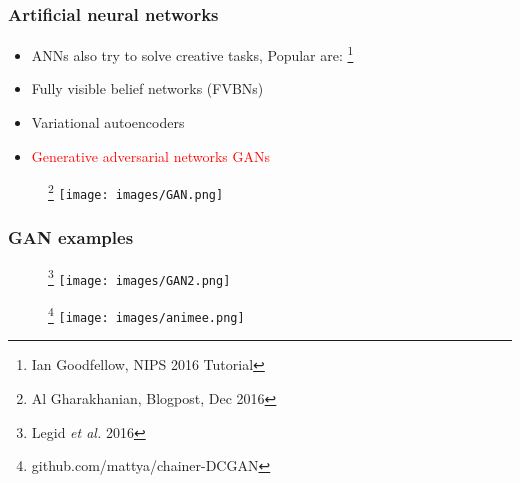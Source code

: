 \documentclass{beamer}
\newcommand{\red}[1]{\textcolor{red}{#1}}
\begin{document}
\begin{frame}
\frametitle{Artificial neural networks}
    \begin{itemize}

        \item ANNs also try to solve creative tasks, 
        Popular are: \footnote{Ian Goodfellow, NIPS 2016 Tutorial }
        \item Fully visible belief networks (FVBNs)
        \item Variational autoencoders
        \item \red{Generative adversarial networks GANs}

    \end{itemize}


    \begin{figure}[ht]
        \centering
        \footnote{Al Gharakhanian,  Blogpost, Dec 2016}
        \texttt{[image: images/GAN.png]}
    \end{figure}   
\end{frame}



\begin{frame}

\frametitle{GAN examples}
    \begin{figure}[ht]
        \centering
        \footnote{Legid \emph{et al.} 2016}
        \texttt{[image: images/GAN2.png]}
    \end{figure}   
    \begin{figure}[ht]
        \centering
        \footnote{github.com/mattya/chainer-DCGAN }
        \texttt{[image: images/animee.png]}
    \end{figure}   
\end{frame}
\end{document}
